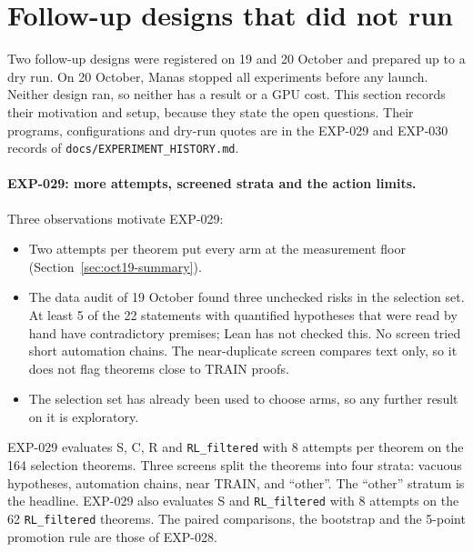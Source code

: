 \documentclass[11pt]{article}
\newcommand{\code}[1]{\texttt{#1}}
\newcommand{\pth}[1]{\nolinkurl{#1}}
\begin{document}
\clearpage
\section{Follow-up designs that did not run}
\label{sec:oct20-not-run}

Two follow-up designs were registered on 19 and 20 October and prepared up to a dry run.
On 20 October, Manas stopped all experiments before any launch.
Neither design ran, so neither has a result or a GPU cost.
This section records their motivation and setup, because they state the open questions.
Their programs, configurations and dry-run quotes are in the EXP-029 and EXP-030 records of \pth{docs/EXPERIMENT_HISTORY.md}.

\paragraph{EXP-029: more attempts, screened strata and the action limits.}
Three observations motivate EXP-029:
\begin{itemize}
\item Two attempts per theorem put every arm at the measurement floor (Section~\ref{sec:oct19-summary}).
\item The data audit of 19 October found three unchecked risks in the selection set. At least 5 of the 22 statements with quantified hypotheses that were read by hand have contradictory premises; Lean has not checked this. No screen tried short automation chains. The near-duplicate screen compares text only, so it does not flag theorems close to TRAIN proofs.
\item The selection set has already been used to choose arms, so any further result on it is exploratory.
\end{itemize}
EXP-029 evaluates S, C, R and \code{RL\_filtered} with 8 attempts per theorem on the 164 selection theorems.
Three screens split the theorems into four strata: vacuous hypotheses, automation chains, near TRAIN, and ``other''.
The ``other'' stratum is the headline.
EXP-029 also evaluates S and \code{RL\_filtered} with 8 attempts on the 62 \code{RL\_filtered} theorems.
The paired comparisons, the bootstrap and the 5-point promotion rule are those of EXP-028.
\end{document}
